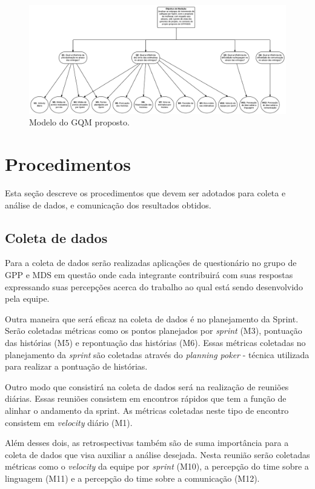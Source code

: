 	\begin{figure}[!htb]
	  \centering
	  \includegraphics[scale=0.27, angle=90]{figuras/GQM}
	  \caption[Modelo do GQM proposto.]{Modelo do GQM proposto.}
	  \label{gqm_proposto}
	\end{figure}

    \section{Procedimentos}

      Esta seção descreve os procedimentos que devem ser adotados para coleta e análise de dados, e comunicação dos resultados obtidos.

      \subsection{Coleta de dados}

      Para a coleta de dados serão realizadas aplicações de questionário no grupo de GPP e MDS em questão onde cada integrante contribuirá com suas respostas expressando suas percepções acerca do trabalho ao qual está sendo desenvolvido pela equipe.

      Outra maneira que será eficaz na coleta de dados é no planejamento da Sprint. Serão coletadas métricas como os pontos planejados por \textit{sprint} (M3), pontuação das histórias (M5) e repontuação das histórias (M6). Essas métricas coletadas no planejamento da \textit{sprint} são coletadas através do \textit{planning poker} - técnica utilizada para realizar a pontuação de histórias.

      Outro modo que consistirá na coleta de dados será na realização de reuniões diárias. Essas reuniões consistem em encontros rápidos que tem a função de alinhar o andamento da sprint. As métricas coletadas neste tipo de encontro consistem em \textit{velocity} diário (M1).

      Além desses dois, as retrospectivas também são de suma importância para a coleta de dados que visa auxiliar a análise desejada. Nesta reunião serão coletadas métricas como o \textit{velocity} da equipe por \textit{sprint} (M10), a percepção do time sobre a linguagem (M11) e a percepção do time sobre a comunicação (M12).

